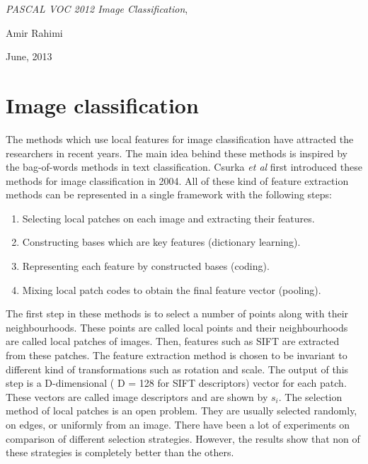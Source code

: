 \documentclass[a4paper,12pt]{article}
\begin{document}
\begin{center}
%
%
\emph{PASCAL VOC 2012 Image Classification},

Amir Rahimi

June, 2013
\end{center}

\section{Image classification}
The methods which use local features for image classification have attracted the researchers in recent years. The main idea behind these methods is inspired by the bag-of-words methods in text classification. Csurka \textit{et al} \cite{shaban3} first introduced these methods for image classification in 2004. All of these kind of feature extraction methods can be represented in a single framework with the following steps:

\begin{enumerate}
\item Selecting  local patches on each image and extracting their features.

\item Constructing bases which are key features (dictionary learning).

\item Representing each feature by constructed bases (coding). 

\item Mixing local patch codes to obtain the final feature vector (pooling).
\end{enumerate}

The first step in these methods is to select a number of points along with their neighbourhoods. These points are called local points  and their neighbourhoods are called local patches of images. Then,  features such as SIFT\cite{shaban18} are extracted from these patches. 
The feature extraction method is chosen to be invariant to different kind of transformations such as rotation and scale. The output of this
step is a D-dimensional ( D = 128 for SIFT descriptors) vector for each patch. These vectors are called image descriptors and are shown by 
$s_i$.  The selection method of local patches is an open problem. They are usually selected randomly, on edges, or uniformly from an image. There have been a lot of experiments on comparison of different selection strategies\cite{shaban19}. However, the results show that non of these strategies is completely better than the others.
\end{document}
